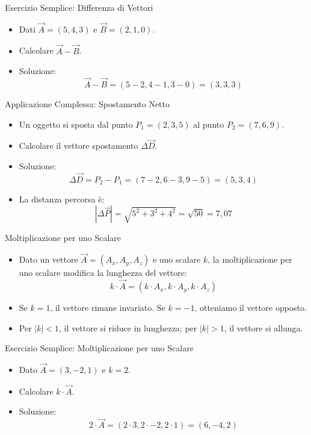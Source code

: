 \documentclass{beamer}
\begin{document}
\begin{frame}{Esercizio Semplice: Differenza di Vettori}
    \begin{itemize}
        \item Dati \( \vec{A} = (5, 4, 3) \) e \( \vec{B} = (2, 1, 0) \).
        \item Calcolare \( \vec{A} - \vec{B} \).
        \item Soluzione:
        \[
        \vec{A} - \vec{B} = (5-2, 4-1, 3-0) = (3, 3, 3)
        \]
    \end{itemize}
\end{frame}

\begin{frame}{Applicazione Complessa: Spostamento Netto}
    \begin{itemize}
        \item Un oggetto si sposta dal punto \( P_1 = (2, 3, 5) \) al punto \( P_2 = (7, 6, 9) \).
        \item Calcolare il vettore spostamento \( \Delta\vec{D} \).
        \item Soluzione:
        \[
        \Delta\vec{D} = P_2 - P_1 = (7-2, 6-3, 9-5) = (5, 3, 4)
        \]
        \item La distanza percorsa è:
        \[
        |\Delta\vec{P}| = \sqrt{5^2 + 3^2 + 4^2} = \sqrt{50} = 7,07
        \]
    \end{itemize}
\end{frame}

\begin{frame}{Moltiplicazione per uno Scalare}
    \begin{itemize}
        \item Dato un vettore \( \vec{A} = (A_x, A_y, A_z) \) e uno scalare \( k \), la moltiplicazione per uno scalare modifica la lunghezza del vettore:
        \[
        k \cdot \vec{A} = (k \cdot A_x, k \cdot A_y, k \cdot A_z)
        \]
        \item Se \( k = 1 \), il vettore rimane invariato. Se \( k = -1 \), otteniamo il vettore opposto.
        \item Per \( |k| < 1 \), il vettore si riduce in lunghezza; per \( |k| > 1 \), il vettore si allunga.
    \end{itemize}
\end{frame}

\begin{frame}{Esercizio Semplice: Moltiplicazione per uno Scalare}
    \begin{itemize}
        \item Dato \( \vec{A} = (3, -2, 1) \) e \( k = 2 \).
        \item Calcolare \( k \cdot \vec{A} \).
        \item Soluzione:
        \[
        2 \cdot \vec{A} = (2 \cdot 3, 2 \cdot -2, 2 \cdot 1) = (6, -4, 2)
        \]
    \end{itemize}
\end{frame}
\end{document}
